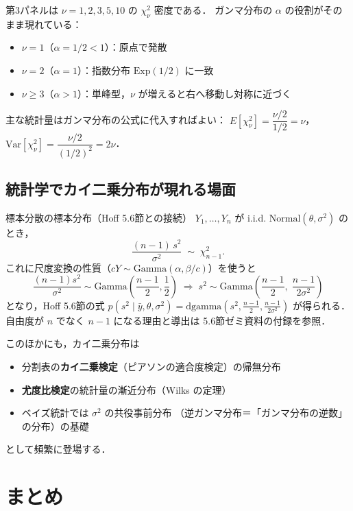 \documentclass[lualatex,ja=standard,a4paper,12pt]{bxjsarticle}
\begin{document}
\medskip
\noindent
第3パネルは $\nu = 1, 2, 3, 5, 10$ の $\chi^2_\nu$ 密度である．
ガンマ分布の $\alpha$ の役割がそのまま現れている：
\begin{itemize}
  \item $\nu = 1$（$\alpha = 1/2 < 1$）：原点で発散
  \item $\nu = 2$（$\alpha = 1$）：指数分布 $\mathrm{Exp}(1/2)$ に一致
  \item $\nu \geq 3$（$\alpha > 1$）：単峰型，$\nu$ が増えると右へ移動し対称に近づく
\end{itemize}
主な統計量はガンマ分布の公式に代入すればよい：
$E[\chi^2_\nu] = \dfrac{\nu/2}{1/2} = \nu$，
$\mathrm{Var}[\chi^2_\nu] = \dfrac{\nu/2}{(1/2)^2} = 2\nu$．

\subsection{統計学でカイ二乗分布が現れる場面}

\begin{exbox}{標本分散の標本分布（Hoff 5.6節との接続）}
$Y_1, \ldots, Y_n$ が i.i.d. $\mathrm{Normal}(\theta, \sigma^2)$ のとき，
\[
  \frac{(n-1)\,s^2}{\sigma^2} \;\sim\; \chi^2_{n-1}.
\]
これに尺度変換の性質（$cY \sim \mathrm{Gamma}(\alpha, \beta/c)$）を使うと
\[
  \frac{(n-1)s^2}{\sigma^2} \sim \mathrm{Gamma}\!\left(\frac{n-1}{2}, \frac{1}{2}\right)
  \;\Longrightarrow\;
  s^2 \sim \mathrm{Gamma}\!\left(\frac{n-1}{2},\; \frac{n-1}{2\sigma^2}\right)
\]
となり，Hoff 5.6節の式
$p(s^2 \mid \bar{y}, \theta, \sigma^2) = \mathrm{dgamma}(s^2, \frac{n-1}{2}, \frac{n-1}{2\sigma^2})$
が得られる．
自由度が $n$ でなく $n-1$ になる理由と導出は
5.6節ゼミ資料の付録を参照．
\end{exbox}

\medskip
\noindent このほかにも，カイ二乗分布は
\begin{itemize}
  \item 分割表の\textbf{カイ二乗検定}（ピアソンの適合度検定）の帰無分布
  \item \textbf{尤度比検定}の統計量の漸近分布（Wilks の定理）
  \item ベイズ統計では $\sigma^2$ の共役事前分布
        （逆ガンマ分布＝「ガンマ分布の逆数」の分布）の基礎
\end{itemize}
として頻繁に登場する．

\section{まとめ}
\end{document}
